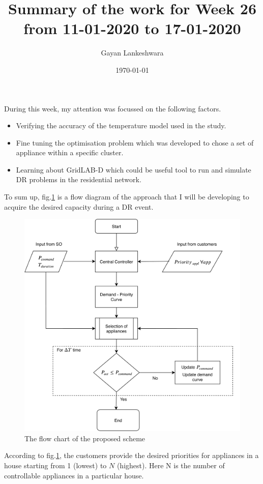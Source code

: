 \documentclass[12pt,a4paper]{article}
\title{\large\textbf{Summary of the work for Week 26 \\
 from 11-01-2020 to 17-01-2020 }  }
\author{\small Gayan Lankeshwara}
\date{\small \today}
\begin{document}
\maketitle

During this week, my attention was focussed on the following factors.
\begin{itemize}
    \item Verifying the accuracy of the temperature model used in the study.
    \item Fine tuning the optimisation problem which was developed to chose a set of appliance within a specific cluster.
    \item Learning about GridLAB-D which could be useful tool to run and simulate DR problems in the residential network.
\end{itemize}

To sum up, fig.\ref{fig:flow_chart} is a flow diagram of the approach that I will be developing to acquire the desired capacity during a DR event.\\

\begin{figure}[htb!]
    \centering
    \includegraphics[width =13cm]{images/flow_chart.pdf}
    \caption{The flow chart of the proposed scheme}
    \label{fig:flow_chart}
\end{figure}

According to fig.\ref{fig:flow_chart}, the customers provide the desired priorities for appliances in a house starting from 1 (lowest) to $N$ (highest). Here N is the number of controllable appliances in a particular house. \\
\end{document}
